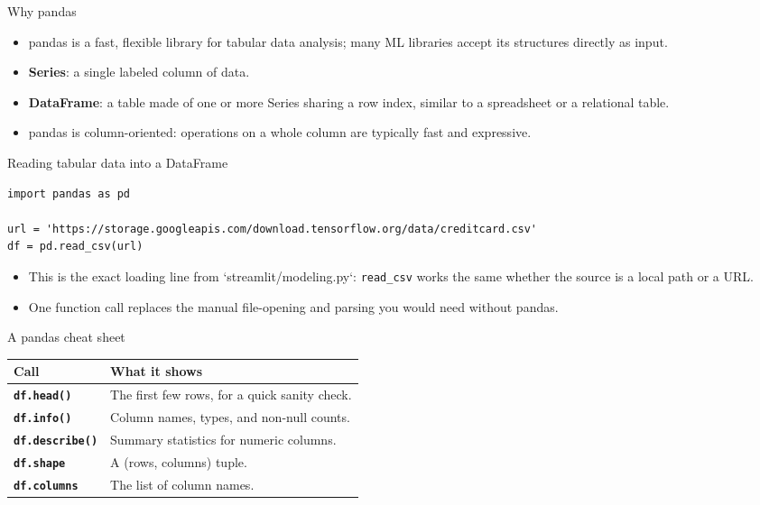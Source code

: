 \begin{frame}{Why pandas}
\begin{itemize}
\item pandas is a fast, flexible library for tabular data analysis; many ML libraries accept its structures directly as input.
\item \textbf{Series}: a single labeled column of data.
\item \textbf{DataFrame}: a table made of one or more Series sharing a row index, similar to a spreadsheet or a relational table.
\item pandas is column-oriented: operations on a whole column are typically fast and expressive.
\end{itemize}
\coursefooter
\end{frame}

\begin{frame}[fragile]{Reading tabular data into a DataFrame}
\begin{lstlisting}[style=coursepython]
import pandas as pd

url = 'https://storage.googleapis.com/download.tensorflow.org/data/creditcard.csv'
df = pd.read_csv(url)
\end{lstlisting}
\begin{itemize}
\item This is the exact loading line from `streamlit/modeling.py`: \texttt{read\_csv} works the same whether the source is a local path or a URL.
\item One function call replaces the manual file-opening and parsing you would need without pandas.
\end{itemize}
\coursefooter
\end{frame}

\begin{frame}{A pandas cheat sheet}
\begin{tabularx}{\textwidth}{>{\bfseries}l X}
Call & What it shows \\
\toprule
\texttt{df.head()} & The first few rows, for a quick sanity check. \\
\texttt{df.info()} & Column names, types, and non-null counts. \\
\texttt{df.describe()} & Summary statistics for numeric columns. \\
\texttt{df.shape} & A (rows, columns) tuple. \\
\texttt{df.columns} & The list of column names. \\
\bottomrule
\end{tabularx}
\coursefooter
\end{frame}

